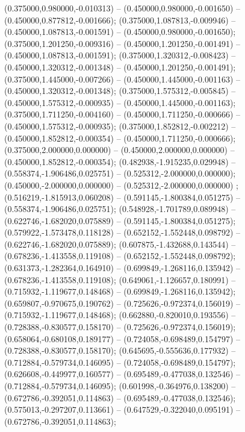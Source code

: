  (0.375000,0.980000,-0.010313) -- (0.450000,0.980000,-0.001650) -- (0.450000,0.877812,-0.001666);
 (0.375000,1.087813,-0.009946) -- (0.450000,1.087813,-0.001591) -- (0.450000,0.980000,-0.001650);
 (0.375000,1.201250,-0.009316) -- (0.450000,1.201250,-0.001491) -- (0.450000,1.087813,-0.001591);
 (0.375000,1.320312,-0.008423) -- (0.450000,1.320312,-0.001348) -- (0.450000,1.201250,-0.001491);
 (0.375000,1.445000,-0.007266) -- (0.450000,1.445000,-0.001163) -- (0.450000,1.320312,-0.001348);
 (0.375000,1.575312,-0.005845) -- (0.450000,1.575312,-0.000935) -- (0.450000,1.445000,-0.001163);
 (0.375000,1.711250,-0.004160) -- (0.450000,1.711250,-0.000666) -- (0.450000,1.575312,-0.000935);
 (0.375000,1.852812,-0.002212) -- (0.450000,1.852812,-0.000354) -- (0.450000,1.711250,-0.000666);
 (0.375000,2.000000,0.000000) -- (0.450000,2.000000,0.000000) -- (0.450000,1.852812,-0.000354);
 (0.482938,-1.915235,0.029948) -- (0.558374,-1.906486,0.025751) -- (0.525312,-2.000000,0.000000);
 (0.450000,-2.000000,0.000000) -- (0.525312,-2.000000,0.000000) ;
 (0.516219,-1.815913,0.060208) -- (0.591145,-1.800384,0.051275) -- (0.558374,-1.906486,0.025751);
 (0.548928,-1.701789,0.089948) -- (0.622746,-1.682020,0.075889) -- (0.591145,-1.800384,0.051275);
 (0.579922,-1.573478,0.118128) -- (0.652152,-1.552448,0.098792) -- (0.622746,-1.682020,0.075889);
 (0.607875,-1.432688,0.143544) -- (0.678236,-1.413558,0.119108) -- (0.652152,-1.552448,0.098792);
 (0.631373,-1.282364,0.164910) -- (0.699849,-1.268116,0.135942) -- (0.678236,-1.413558,0.119108);
 (0.649061,-1.126657,0.180991) -- (0.715932,-1.119677,0.148468) -- (0.699849,-1.268116,0.135942);
 (0.659807,-0.970675,0.190762) -- (0.725626,-0.972374,0.156019) -- (0.715932,-1.119677,0.148468);
 (0.662880,-0.820010,0.193556) -- (0.728388,-0.830577,0.158170) -- (0.725626,-0.972374,0.156019);
 (0.658064,-0.680108,0.189177) -- (0.724058,-0.698489,0.154797) -- (0.728388,-0.830577,0.158170);
 (0.645695,-0.555636,0.177932) -- (0.712884,-0.579734,0.146095) -- (0.724058,-0.698489,0.154797);
 (0.626608,-0.449977,0.160577) -- (0.695489,-0.477038,0.132546) -- (0.712884,-0.579734,0.146095);
 (0.601998,-0.364976,0.138200) -- (0.672786,-0.392051,0.114863) -- (0.695489,-0.477038,0.132546);
 (0.575013,-0.297207,0.113661) -- (0.647529,-0.322040,0.095191) -- (0.672786,-0.392051,0.114863);
